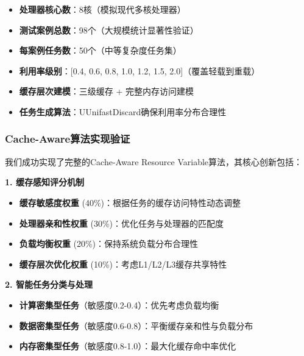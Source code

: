 \begin{tcolorbox}[
    colback=green!5!white,
    colframe=green!50!black,
    title=\textbf{实验配置参数},
    fonttitle=\bfseries,
    arc=3pt
]
\begin{itemize}
    \item \textbf{处理器核心数}：8核（模拟现代多核处理器）
    \item \textbf{测试案例总数}：98个（大规模统计显著性验证）
    \item \textbf{每案例任务数}：50个（中等复杂度任务集）
    \item \textbf{利用率级别}：[0.4, 0.6, 0.8, 1.0, 1.2, 1.5, 2.0]（覆盖轻载到重载）
    \item \textbf{缓存层次建模}：三级缓存 + 完整内存访问建模
    \item \textbf{任务生成算法}：UUnifastDiscard确保利用率分布合理性
\end{itemize}
\end{tcolorbox}

\subsubsection{Cache-Aware算法实现验证}

我们成功实现了完整的Cache-Aware Resource Variable算法，其核心创新包括：

\textbf{1. 缓存感知评分机制}
\begin{tcolorbox}[
    colback=lightblue!10!white,
    colframe=blue!50!black,
    arc=3pt
]
\begin{itemize}
    \item \textbf{缓存敏感度权重} (40\%)：根据任务的缓存访问特性动态调整
    \item \textbf{处理器亲和性权重} (30\%)：优化任务与处理器的匹配度
    \item \textbf{负载均衡权重} (20\%)：保持系统负载分布合理性
    \item \textbf{缓存层次优化权重} (10\%)：考虑L1/L2/L3缓存共享特性
\end{itemize}
\end{tcolorbox}

\textbf{2. 智能任务分类与处理}
\begin{tcolorbox}[
    colback=orange!10!white,
    colframe=orange!50!black,
    arc=3pt
]
\begin{itemize}
    \item \textbf{计算密集型任务}（敏感度0.2-0.4）：优先考虑负载均衡
    \item \textbf{数据密集型任务}（敏感度0.6-0.8）：平衡缓存亲和性与负载分布  
    \item \textbf{内存密集型任务}（敏感度0.8-1.0）：最大化缓存命中率优化
\end{itemize}
\end{tcolorbox}

